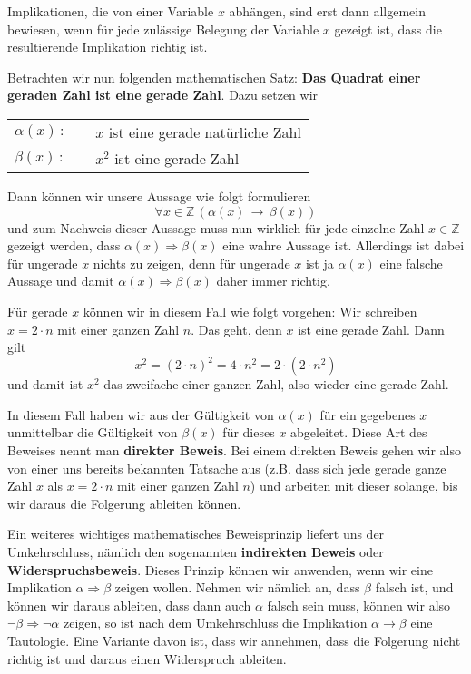 \begin{notiz} Implikationen, die von einer Variable $x$ abhängen, sind erst dann allgemein bewiesen, wenn 
für jede zulässige Belegung der Variable $x$ gezeigt ist, dass die resultierende Implikation richtig ist.

Betrachten wir nun folgenden mathematischen Satz: \textbf{ Das Quadrat einer geraden Zahl ist eine gerade Zahl}. 
Dazu setzen wir

\begin{tabular} {l c l}
$\alpha(x)\,:$ & \quad & $x$ ist eine gerade natürliche Zahl \\
$\beta(x)\,:$ & \quad & $x^2$ ist eine gerade Zahl
\end{tabular}

Dann können wir unsere Aussage wie folgt formulieren
  	$$ \forall x \in \mathbb Z \, \left( \alpha(x) \, \longrightarrow \, \beta(x) \right) $$
und zum Nachweis dieser Aussage muss nun wirklich für jede einzelne Zahl $x \in \mathbb Z$ gezeigt werden, 
dass $\alpha(x) \Longrightarrow \beta(x)$ eine wahre Aussage ist. Allerdings ist dabei für ungerade $x$ nichts 
zu zeigen, denn für ungerade $x$ ist ja $\alpha(x)$ eine falsche Aussage und damit $\alpha(x) \Rightarrow 
\beta(x)$ daher immer richtig. 

Für gerade $x$ können wir in diesem Fall wie folgt vorgehen: Wir schreiben $x = 2 \cdot n$ mit einer 
ganzen Zahl $n$. Das geht, denn $x$ ist eine gerade Zahl. Dann gilt 
 	$$ x^2 = (2 \cdot n)^2 = 4 \cdot n^2 = 2\cdot (2 \cdot n^2) $$
und damit ist $x^2$ das zweifache einer ganzen Zahl, also wieder eine gerade Zahl. 

In diesem Fall haben wir aus der Gültigkeit von $\alpha(x)$ für ein gegebenes $x$ unmittelbar die Gültigkeit von 
$\beta(x)$ für dieses $x$ abgeleitet. Diese Art des Beweises nennt man \textbf{direkter Beweis}. Bei einem 
direkten Beweis gehen wir also von einer uns bereits bekannten Tatsache aus (z.B. dass sich jede gerade ganze 
Zahl $x$ als $x = 2 \cdot n$ mit einer ganzen Zahl $n$) und arbeiten mit dieser solange, bis wir daraus die 
Folgerung ableiten können. 

Ein weiteres wichtiges mathematisches Beweisprinzip liefert uns der Umkehrschluss, nämlich den 
sogenannten \textbf{indirekten Beweis} oder \textbf{Wider\-spruchs\-beweis}. 
Dieses Prinzip können wir anwenden, 
wenn wir eine Implikation $\alpha \Longrightarrow \beta$ zeigen wollen. Nehmen wir nämlich an, dass $\beta$ falsch 
ist, und können wir daraus ableiten, dass dann auch $\alpha$ falsch sein muss, können wir also 
$\neg \beta \Longrightarrow \neg \alpha$ zeigen, so ist nach dem Umkehrschluss die Implikation $\alpha 
\longrightarrow \beta$ eine Tautologie. Eine Variante davon ist, dass wir annehmen, dass die Folgerung nicht 
richtig ist und daraus einen Widerspruch ableiten. 


\end{notiz}
